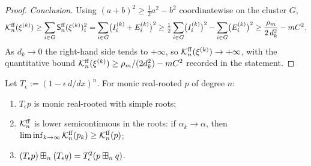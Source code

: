 \begin{proof}
\smallskip\noindent\emph{Conclusion.}
Using $(a+b)^2\ge\tfrac12 a^2-b^2$ coordinatewise on the cluster $G$,
\[
\mathcal{K}^{\mathrm{ff}}_n(\xi^{(k)})\ge\sum_{i\in G}\mathsf{S}^{\mathrm{ff}}_n(\xi^{(k)})_i^2
=\sum_{i\in G}\bigl(I^{(k)}_i+E^{(k)}_i\bigr)^2
\ge\tfrac12\sum_{i\in G}\bigl(I^{(k)}_i\bigr)^2-\sum_{i\in G}\bigl(E^{(k)}_i\bigr)^2
\ge\frac{\rho_m}{2\,d_k^2}-mC^2 .
\]
As $d_k\to0$ the right-hand side tends to $+\infty$, so
$\mathcal{K}^{\mathrm{ff}}_n(\xi^{(k)})\to+\infty$, with the quantitative bound
$\mathcal{K}^{\mathrm{ff}}_n(\xi^{(k)})\ge\rho_m/(2d_k^2)-mC^2$ recorded in the statement.
\end{proof}


\begin{qfourlemma}\label{lem:simple}
Let $T_\epsilon:=(1-\epsilon\,d/dx)^n$. For monic real-rooted $p$ of degree $n$:
\begin{enumerate}\setlength\itemsep{2pt}
\item $T_\epsilon p$ is monic real-rooted with simple roots;
\item $\mathcal{K}^{\mathrm{ff}}_n$ is lower semicontinuous in the roots: if $\alpha_k\to\alpha$,
then $\liminf_{k\to\infty}\mathcal{K}^{\mathrm{ff}}_n(p_k)\ge\mathcal{K}^{\mathrm{ff}}_n(p)$;
\item $(T_\epsilon p)\boxplus_n(T_\epsilon q)=T_\epsilon^2(p\boxplus_n q)$.
\end{enumerate}
\end{qfourlemma}

